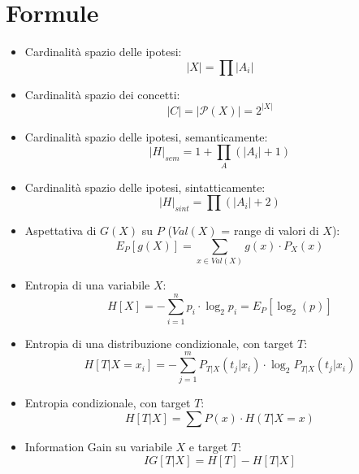 \documentclass[a4paper,12pt, oneside]{article}
\title{}
\author{}
\date{}
\begin{document}

\newtheorem{teorema}{Teorema}
\newtheorem{definizione}{Definizione}
\newtheorem{esempio}{Esempio}
\newtheorem{corollario}{Corollario}
\newtheorem{lemma}{Lemma}
\newtheorem{osservazione}{Osservazione}
\newtheorem{nota}{Nota}
\newtheorem{esercizio}{Esercizio}

\renewcommand{\sectionmark}[1]{\markright{\thesection.\ #1}}
\allsectionsfont{\centering}
\section*{Formule}
\begin{itemize}
  \item Cardinalità spazio delle ipotesi:
  \[|X|=\prod |A_i|\]
  \item Cardinalità spazio dei concetti:
  \[|C|=|\mathcal{P}(X)|=2^{|X|}\]
  \item Cardinalità spazio delle ipotesi, semanticamente:
  \[|H|_{sem}=1+\prod_{A} (|A_i|+1)\]
  \item Cardinalità spazio delle ipotesi, sintatticamente:
  \[|H|_{sint}=\prod (|A_i|+2)\]
  \item Aspettativa di $G(X)$ su $P$ ($Val(X)$ = range di valori di $X$):
  \[E_P[g(X)]=\sum_{x\in Val(X)} g(x)\cdot P_X(x)\]
  \item Entropia di una variabile $X$:
  \[H[X]=-\sum_{i=1}^n p_i\cdot\log_2 p_i=E_P[\log_2(p)]\]
  \item Entropia di una distribuzione condizionale, con target $T$:
  \[H[T|X=x_i]=-\sum_{j=1}^m P_{T|X}(t_j|x_i)\cdot \log_2 P_{T|X}(t_j|x_i)\]
  \item Entropia condizionale, con target $T$:
  \[H[T|X]=\sum P(x)\cdot H(T|X=x)\]
  \item Information Gain su variabile $X$ e target $T$:
  \[IG[T|X]=H[T]-H[T|X]\]

\end{itemize}
\newpage
\end{document}
